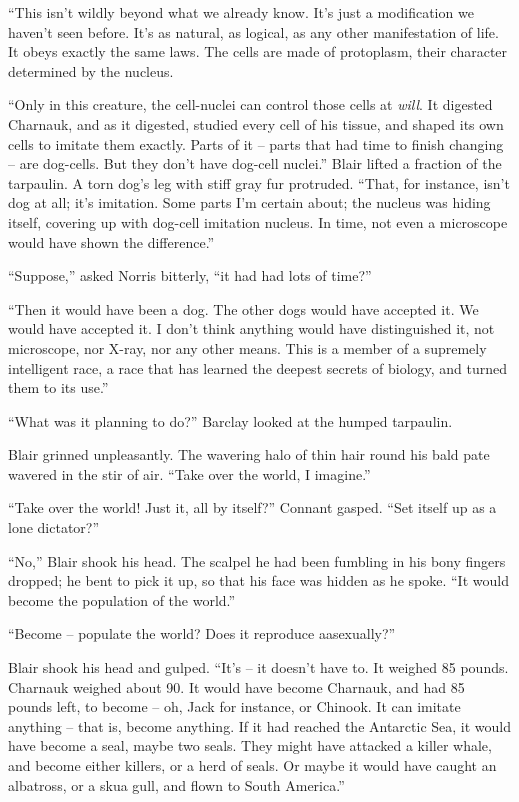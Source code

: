 \documentclass[ebook,oneside,11pt]{memoir}				%
\begin{document}
``This isn't wildly beyond what we already know. It's just a modification we haven't seen before. It's as natural, as logical, as any other manifestation of life. It obeys exactly the same laws. The cells are made of protoplasm, their character determined by the nucleus.

``Only in this creature, the cell-nuclei can control those cells at \emph{will}. It digested Charnauk, and as it digested, studied every cell of his tissue, and shaped its own cells to imitate them exactly. Parts of it -- parts that had time to finish changing -- are dog-cells. But they don't have dog-cell nuclei.'' Blair lifted a fraction of the tarpaulin. A torn dog's leg with stiff gray fur protruded. ``That, for instance, isn't dog at all; it's imitation. Some parts I'm certain about; the nucleus was hiding itself, covering up with dog-cell imitation nucleus. In time, not even a microscope would have shown the difference.''

``Suppose,'' asked Norris bitterly, ``it had had lots of time?''

``Then it would have been a dog. The other dogs would have accepted it. We would have accepted it. I don't think anything would have distinguished it, not microscope, nor X-ray, nor any other means. This is a member of a supremely intelligent race, a race that has learned the deepest secrets of biology, and turned them to its use.''

``What was it planning to do?'' Barclay looked at the humped tarpaulin.

Blair grinned unpleasantly. The wavering halo of thin hair round his bald pate wavered in the stir of air. ``Take over the world, I imagine.''

``Take over the world! Just it, all by itself?'' Connant gasped. ``Set itself up as a lone dictator?''

``No,'' Blair shook his head. The scalpel he had been fumbling in his bony fingers dropped; he bent to pick it up, so that his face was hidden as he spoke. ``It would become the population of the world.''

``Become -- populate the world? Does it reproduce aasexually?''

Blair shook his head and gulped. ``It's -- it doesn't have to. It weighed 85 pounds. Charnauk weighed about 90. It would have become Charnauk, and had 85 pounds left, to become -- oh, Jack for instance, or Chinook. It can imitate anything -- that is, become anything. If it had reached the Antarctic Sea, it would have become a seal, maybe two seals. They might have attacked a killer whale, and become either killers, or a herd of seals. Or maybe it would have caught an albatross, or a skua gull, and flown to South America.''
\end{document}
